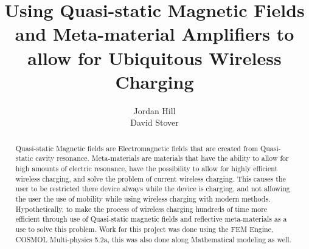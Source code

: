 \documentclass[]{article}
\title{Using Quasi-static Magnetic Fields and Meta-material Amplifiers to allow for Ubiquitous Wireless Charging}
\author{Jordan Hill \\ David Stover}
\begin{document}
	
\maketitle

\pagebreak

\begin{abstract}
Quasi-static Magnetic fields are Electromagnetic fields that are created from Quasi-static cavity resonance. Meta-materials are materials that have the ability to allow for high amounts of electric resonance, have the possibility to allow for highly efficient wireless charging, and solve the problem of current wireless charging. This causes the user to be restricted there device always while the device is charging, and not allowing the user the use of mobility while using wireless charging with modern methods. Hypothetically, to make the process of wireless charging hundreds of time more efficient through use of Quasi-static magnetic fields and reflective meta-materials as a use to solve this problem. Work for this project was done using the FEM Engine, COSMOL Multi-physics 5.2a, this was also done along Mathematical modeling as well.
\end{abstract}

\pagebreak
\end{document}
